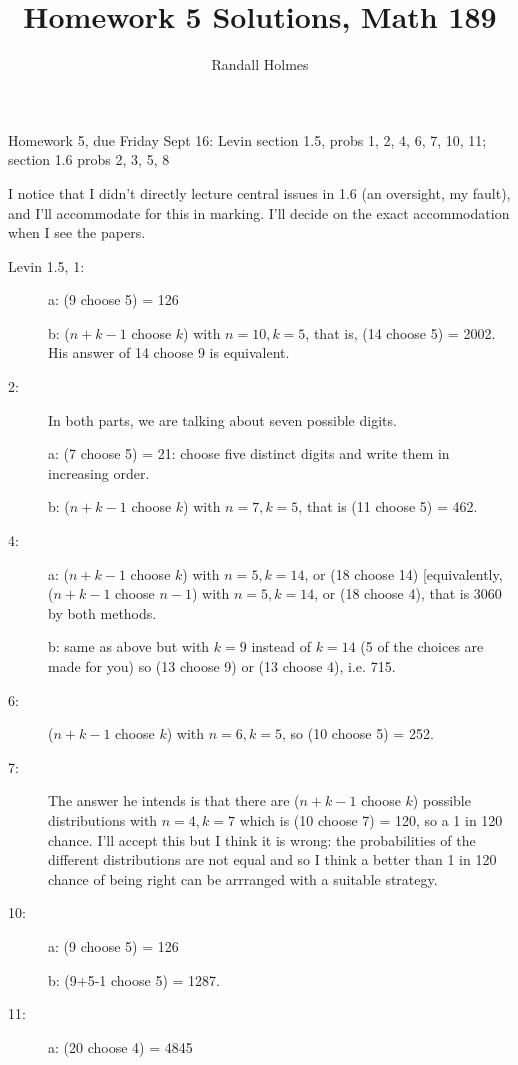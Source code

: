 \documentclass[12pt]{article}
\title{Homework 5 Solutions, Math 189}
\author{Randall Holmes}
\begin{document}
\maketitle

Homework 5, due Friday Sept 16: Levin section 1.5, probs 1, 2, 4, 6, 7, 10, 11; section 1.6 probs 2, 3, 5, 8

I notice that I didn't directly lecture central issues in 1.6 (an oversight, my fault), and I'll accommodate for this in marking.  I'll decide on the exact accommodation when I see the papers.

\begin{description}

\item[Levin 1.5, 1:]  a:  (9 choose 5) = 126

b:  ($n+k-1$ choose $k$) with $n=10, k=5$, that is, (14 choose 5) = 2002.  His answer of 14 choose 9 is equivalent.

\item[2:]   In both parts, we are talking about seven possible digits.

a:  (7 choose 5) = 21:  choose five distinct digits and write them in increasing order.

b:  ($n+k-1$ choose $k$) with $n=7, k=5$, that is (11 choose 5) = 462.

\item[4:]  a:  ($n+k-1$ choose $k$) with $n=5, k=14$, or (18 choose 14) [equivalently, ($n+k-1$ choose $n-1$) with $n=5,k=14$, or (18 choose 4), that is 3060 by both methods.

b:  same as above but with $k=9$ instead of $k=14$ (5 of the choices are made for you) so
(13 choose 9) or (13 choose 4), i.e. 715.

\item[6:]  ($n+k-1$ choose $k$) with $n=6, k=5$, so (10 choose 5) = 252.

\item[7:]  The answer he intends is that there are ($n+k-1$ choose $k$) possible distributions with $n=4, k=7$ which is (10 choose 7) = 120, so a 1 in 120 chance.  I'll accept this but I think it is wrong:  the probabilities of the different distributions are not equal and so I think a better than 1 in 120 chance of being right can be arrranged with a suitable strategy.

\item[10:]  a:  (9 choose 5) = 126

b: (9+5-1 choose 5) = 1287.

\item[11:]  a:  (20 choose 4) = 4845


\end{description}
\end{document}
